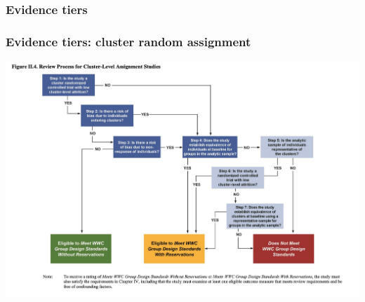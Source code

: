 \documentclass[usenames,dvipsnames]{beamer}
\begin{document}

\begin{frame}[label= doe_evidence]
\frametitle{Evidence tiers}


\end{frame}


\begin{frame}[label= doe_cluster]
\frametitle{Evidence tiers: cluster random assignment}

\begin{center}
\vspace{-0.85cm}
\hspace*{-1cm}
\includegraphics[scale=0.5]{../figs/DoE_clusters.png} 
\end{center}

\end{frame}
\end{document}
